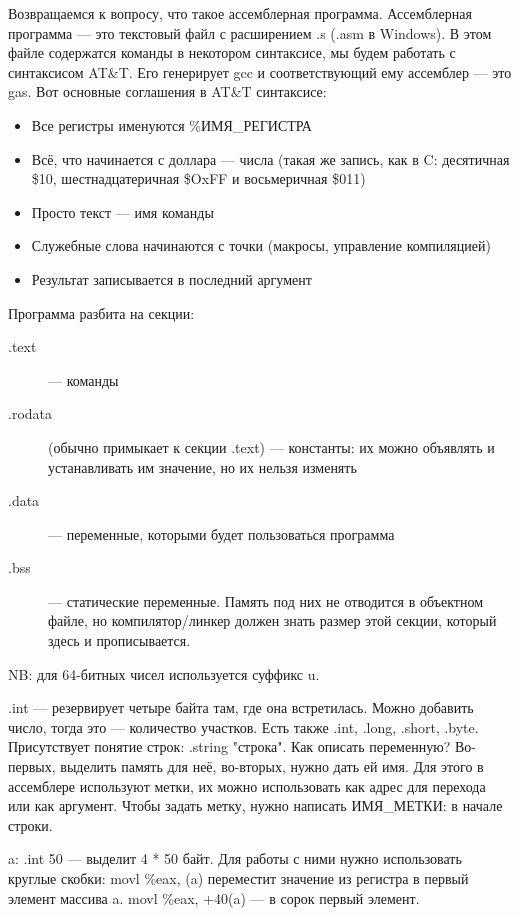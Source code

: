 \documentclass[main]{subfiles}
\begin{document}
Возвращаемся к вопросу, что такое ассемблерная программа.
Ассемблерная программа --- это текстовый файл с расширением .s (.asm в Windows).
В этом файле содержатся команды в некотором синтаксисе, мы будем
работать с синтаксисом AT\&T. Его генерирует gcc и соответствующий ему
ассемблер --- это gas. Вот основные соглашения в AT\&T синтаксисе: 
\begin{itemize}
\item Все регистры именуются \%ИМЯ\_РЕГИСТРА
\item Всё, что начинается с доллара --- числа (такая же запись, как в C: десятичная
\$10, шестнадцатеричная \$OxFF и восьмеричная \$011)
\item Просто текст --- имя команды
\item Служебные слова начинаются с точки (макросы, управление компиляцией)
\item Результат записывается в последний аргумент
\end{itemize}

Программа разбита на секции:
\begin{description}
\item[.text] --- команды
\item[.rodata] (обычно примыкает к секции .text) --- константы: их
можно объявлять и устанавливать им значение, но их нельзя изменять
\item[.data] --- переменные, которыми будет пользоваться программа
\item[.bss] --- статические переменные. Память под них не отводится в объектном файле,
но компилятор/линкер должен знать размер этой секции, который здесь и прописывается.
\end{description}

NB: для 64-битных чисел используется суффикс u.

.int --- резервирует четыре байта там, где она встретилась.
Можно добавить число, тогда это --- количество участков.  Есть
также .int, .long, .short, .byte. Присутствует понятие строк:
.string "строка". Как описать переменную? Во-первых, выделить память для неё,
во-вторых, нужно дать ей имя. Для этого в ассемблере используют метки,
их можно использовать как адрес для перехода или как аргумент.
Чтобы задать метку, нужно написать ИМЯ\_МЕТКИ: в начале строки.

a: .int 50 --- выделит 4 * 50 байт.
Для работы с ними нужно использовать круглые скобки:
movl \%eax, (a) переместит значение из регистра в первый элемент массива a.
movl \%eax, +40(a) --- в сорок первый элемент.
\end{document}
